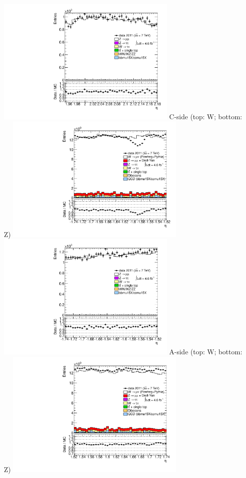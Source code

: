 {\includegraphics[width=0.66\textwidth]{dates/20130306/figures/both/Z_10_A_stack_lN_eta_ALL.pdf} 
\cole
}
 {
\colb[T]
C-side (top: W; bottom: Z)
\centering
\includegraphics[width=0.66\textwidth]{dates/20130306/figures/wfix/WNOM_8_C_stack_l_eta_POS} \\
\includegraphics[width=0.66\textwidth]{dates/20130306/figures/both/Z_8_C_stack_lP_eta_ALL.pdf}
A-side (top: W; bottom: Z)
\centering
\includegraphics[width=0.66\textwidth]{dates/20130306/figures/wfix/WNOM_8_A_stack_l_eta_POS} \\
}
